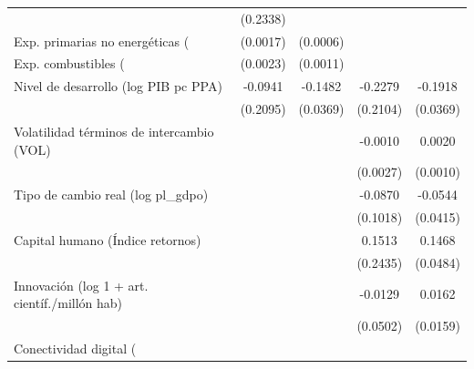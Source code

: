 \begin{table}[htbp]
\begin{tabular}{l*{4}{c}}
                    &    (0.2338)         &                     &                     &                     \\
\addlinespace
Exp. primarias no energéticas (%
                    &    (0.0017)         &    (0.0006)         &                     &                     \\
\addlinespace
Exp. combustibles (%
                    &    (0.0023)         &    (0.0011)         &                     &                     \\
\addlinespace
Nivel de desarrollo (log PIB pc PPA)&     -0.0941         &     -0.1482\sym{***}&     -0.2279         &     -0.1918\sym{***}\\
                    &    (0.2095)         &    (0.0369)         &    (0.2104)         &    (0.0369)         \\
\addlinespace
Volatilidad términos de intercambio (VOL)&                     &                     &     -0.0010         &      0.0020\sym{*}  \\
                    &                     &                     &    (0.0027)         &    (0.0010)         \\
\addlinespace
Tipo de cambio real (log pl\_gdpo)&                     &                     &     -0.0870         &     -0.0544         \\
                    &                     &                     &    (0.1018)         &    (0.0415)         \\
\addlinespace
Capital humano (Índice retornos)&                     &                     &      0.1513         &      0.1468\sym{***}\\
                    &                     &                     &    (0.2435)         &    (0.0484)         \\
\addlinespace
Innovación (log 1 + art. científ./millón hab)&                     &                     &     -0.0129         &      0.0162         \\
                    &                     &                     &    (0.0502)         &    (0.0159)         \\
\addlinespace
Conectividad digital (%

\end{tabular}
\end{table}
